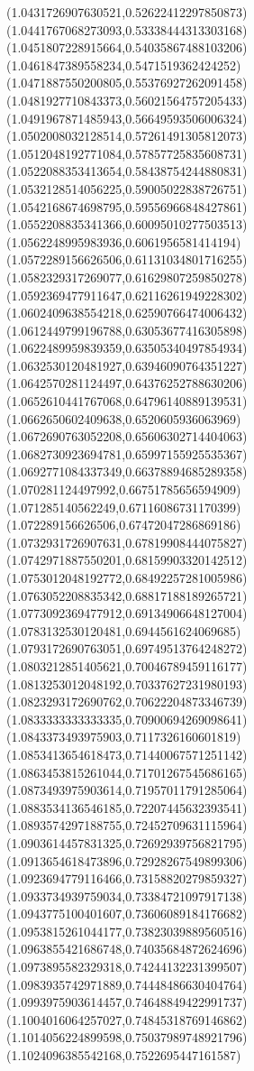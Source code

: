 \documentclass[12pt]{article}
\theoremstyle{plain}
\theoremstyle{definition}
\theoremstyle{remark}
\begin{document}
\begin{figure}
{  (1.0431726907630521,0.52622412297850873)%
  (1.0441767068273093,0.53338444313303168)%
  (1.0451807228915664,0.54035867488103206)%
  (1.0461847389558234,0.5471519362424252)%
  (1.0471887550200805,0.55376927262091458)%
  (1.0481927710843373,0.56021564757205433)%
  (1.0491967871485943,0.56649593506006324)%
  (1.0502008032128514,0.57261491305812073)%
  (1.0512048192771084,0.57857725835608731)%
  (1.0522088353413654,0.58438754244880831)%
  (1.0532128514056225,0.59005022838726751)%
  (1.0542168674698795,0.59556966848427861)%
  (1.0552208835341366,0.60095010277503513)%
  (1.0562248995983936,0.6061956581414194)%
  (1.0572289156626506,0.61131034801716255)%
  (1.0582329317269077,0.61629807259850278)%
  (1.0592369477911647,0.62116261949228302)%
  (1.0602409638554218,0.62590766474006432)%
  (1.0612449799196788,0.63053677416305898)%
  (1.0622489959839359,0.63505340497854934)%
  (1.0632530120481927,0.63946090764351227)%
  (1.0642570281124497,0.64376252788630206)%
  (1.0652610441767068,0.64796140889139531)%
  (1.0662650602409638,0.6520605936063969)%
  (1.0672690763052208,0.65606302714404063)%
  (1.0682730923694781,0.65997155925535367)%
  (1.0692771084337349,0.66378894685289358)%
  (1.070281124497992,0.66751785656594909)%
  (1.071285140562249,0.67116086731170399)%
  (1.072289156626506,0.67472047286869186)%
  (1.0732931726907631,0.67819908444075827)%
  (1.0742971887550201,0.68159903320142512)%
  (1.0753012048192772,0.68492257281005986)%
  (1.0763052208835342,0.68817188189265721)%
  (1.0773092369477912,0.69134906648127004)%
  (1.0783132530120481,0.6944561624069685)%
  (1.0793172690763051,0.69749513764248272)%
  (1.0803212851405621,0.70046789459116177)%
  (1.0813253012048192,0.70337627231980193)%
  (1.0823293172690762,0.70622204873346739)%
  (1.0833333333333335,0.70900694269098641)%
  (1.0843373493975903,0.7117326160601819)%
  (1.0853413654618473,0.71440067571251142)%
  (1.0863453815261044,0.71701267545686165)%
  (1.0873493975903614,0.71957011791285064)%
  (1.0883534136546185,0.72207445632393541)%
  (1.0893574297188755,0.72452709631115964)%
  (1.0903614457831325,0.72692939756821795)%
  (1.0913654618473896,0.72928267549899306)%
  (1.0923694779116466,0.73158820279859327)%
  (1.0933734939759034,0.73384721097917138)%
  (1.0943775100401607,0.73606089184176682)%
  (1.0953815261044177,0.73823039889560516)%
  (1.0963855421686748,0.74035684872624696)%
  (1.0973895582329318,0.74244132231399507)%
  (1.0983935742971889,0.74448486630404764)%
  (1.0993975903614457,0.74648849422991737)%
  (1.1004016064257027,0.74845318769146862)%
  (1.1014056224899598,0.75037989748921796)%
  (1.1024096385542168,0.7522695447161587)%
}
\end{figure}
\end{document}
